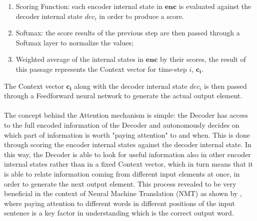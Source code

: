                \begin{enumerate}[topsep=0.5em, partopsep=0.5em]
                    \setlength\itemsep{0em}
                    \item Scoring Function: each encoder internal state in $\mathbf{enc}$ is evaluated against the decoder internal state $dec_i$ in order to produce a score.
                    \item Softmax: the score results of the previous step are then passed through a Softmax layer to normalize the values;
                    \item Weighted average of the internal states in $\mathbf{enc}$ by their scores, the result of this passage represents the Context vector for time-step $i$, $\mathbf{c_i}$.
                \end{enumerate}
                
                The Context vector $\mathbf{c_i}$ along with the decoder internal state $dec_i$ is then passed through a Feedforward neural network to generate the actual output element. 
                \\\\
                The concept behind the Attention mechanism is simple: the Decoder has access to the full encoded information of the Decoder and autonomously decides on which part of information is worth "paying attention" to and when. This is done through scoring the encoder internal states against the decoder internal state. In this way, the Decoder is able to look for useful information also in other encoder internal states rather than in a fixed Context vector, which in turn means that it is able to relate information coming from different input elements at once, in order to generate the next output element. \newline
                This process revealed to be very beneficial in the context of Neural Machine Translation (NMT) as shown by , where paying attention to different words in different positions of the input sentence is a key factor in understanding which is the correct output word.
        
        \newpage      
